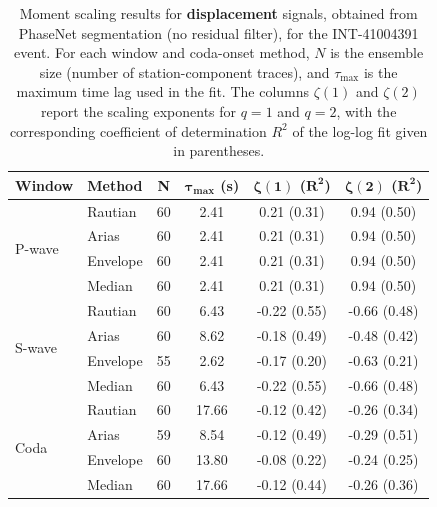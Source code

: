 \begin{table}[H]
\centering
\small
\begin{tabular}{llcccc}
\toprule
\textbf{Window} & \textbf{Method} & \textbf{N} & $\bm{\tau_{\max}}$ \textbf{(s)} & $\bm{\zeta(1)}$ \textbf{(}$\bm{R^2}$\textbf{)} & $\bm{\zeta(2)}$ \textbf{(}$\bm{R^2}$\textbf{)} \\
\midrule
\multirow{4}{*}{P-wave}
& Rautian & 60 & 2.41 & 0.21 (0.31) & 0.94 (0.50) \\
& Arias & 60 & 2.41 & 0.21 (0.31) & 0.94 (0.50) \\
& Envelope & 60 & 2.41 & 0.21 (0.31) & 0.94 (0.50) \\
& Median & 60 & 2.41 & 0.21 (0.31) & 0.94 (0.50) \\
\midrule
\multirow{4}{*}{S-wave}
& Rautian & 60 & 6.43 & -0.22 (0.55) & -0.66 (0.48) \\
& Arias & 60 & 8.62 & -0.18 (0.49) & -0.48 (0.42) \\
& Envelope & 55 & 2.62 & -0.17 (0.20) & -0.63 (0.21) \\
& Median & 60 & 6.43 & -0.22 (0.55) & -0.66 (0.48) \\
\midrule
\multirow{4}{*}{Coda}
& Rautian & 60 & 17.66 & -0.12 (0.42) & -0.26 (0.34) \\
& Arias & 59 & 8.54 & -0.12 (0.49) & -0.29 (0.51) \\
& Envelope & 60 & 13.80 & -0.08 (0.22) & -0.24 (0.25) \\
& Median & 60 & 17.66 & -0.12 (0.44) & -0.26 (0.36) \\
\bottomrule
\end{tabular}
\caption{Moment scaling results for \textbf{displacement} signals, obtained from PhaseNet segmentation (no residual filter), for the INT-41004391 event. For each window and coda-onset method, $N$ is the ensemble size (number of station-component traces), and $\tau_{\max}$ is the maximum time lag used in the fit. The columns $\zeta(1)$ and $\zeta(2)$ report the scaling exponents for $q=1$ and $q=2$, with the corresponding coefficient of determination $R^2$ of the log-log fit given in parentheses.}
\label{tab:phasenet_scaling_disp_nothresh_queyras}
\end{table}